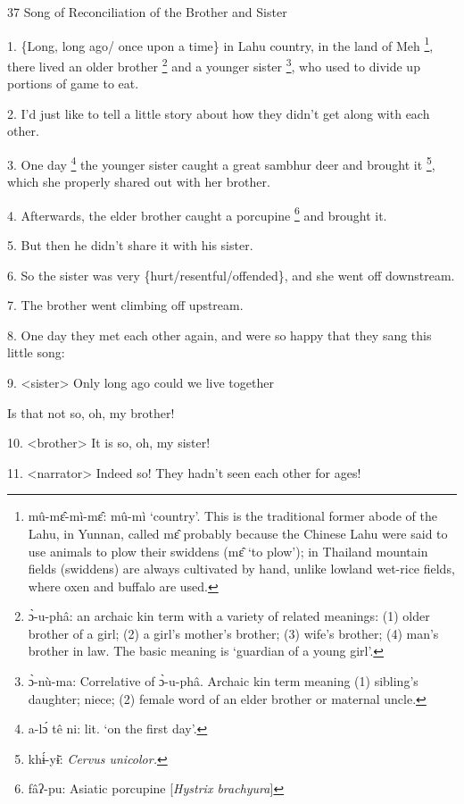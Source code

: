 
37 Song of Reconciliation of the Brother and Sister

1. \{Long, long ago/ once upon a time\} in Lahu country, in the land of Meh \footnote{mû-mɛ̂-mì-mɛ̂: mû-mì `country'. This is the traditional former abode of the Lahu, in Yunnan, called mɛ̂ probably because the Chinese Lahu were said to use animals to plow their swiddens (mɛ̂ `to plow'); in Thailand mountain fields (swiddens) are always cultivated by hand, unlike lowland wet-rice fields, where oxen and buffalo are used.},
there lived an older brother \footnote{ɔ̀-u-phâ: an archaic kin term with a variety of related meanings: (1) older brother of a girl; (2) a girl's mother's brother; (3) wife's brother; (4) man's brother in law.  The basic meaning is `guardian of a young girl'.} and a younger sister \footnote{ɔ̀-nù-ma: Correlative of ɔ̀-u-phâ. Archaic kin term meaning (1) sibling's daughter; niece; (2) female word of an elder brother or maternal uncle.}, who used to divide up
portions of game to eat.

2. I'd just like to tell a little story about how they didn't get along with each
other.

3. One day \footnote{a-lɔ́ tê ni: lit. `on the first day'.} the younger sister caught a great sambhur deer and brought it \footnote{khɨ́-yɨ̄: \textit{Cervus unicolor.}},
which she properly shared out with her brother.

4. Afterwards, the elder brother caught a porcupine \footnote{fâʔ-pu: Asiatic porcupine [\textit{Hystrix brachyura}]} and brought it.

5. But then he didn't share it with his sister.

6. So the sister was very \{hurt/resentful/offended\}, and she went off downstream.

7. The brother went climbing off upstream.

8. One day they met each other again, and were so happy that they sang this little
song:

9. <sister> Only long ago could we live together

Is that not so, oh, my brother!

10. <brother> It is so, oh, my sister!

11. <narrator> Indeed so! They hadn't seen each other for ages!
